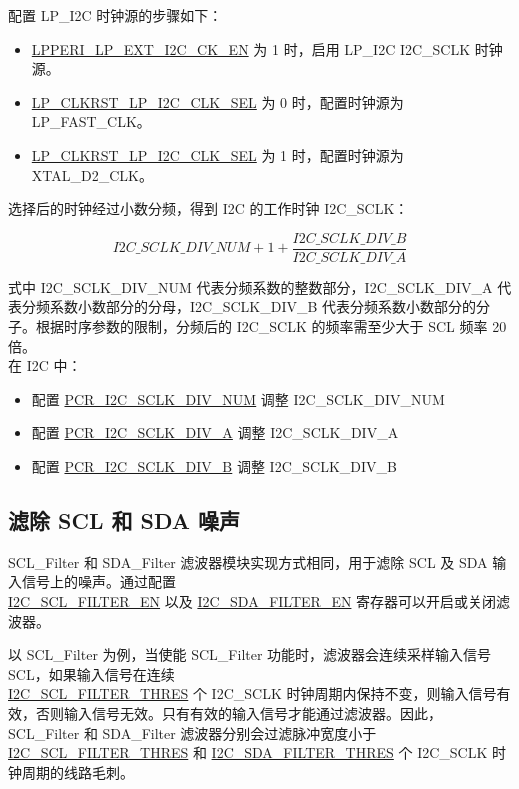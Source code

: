 \documentclass[main\_\_CN.tex]{subfiles}
\begin{document}
配置 LP\_I2C 时钟源的步骤如下：

\begin{itemize}
    \item \hyperref[fielddesc:LPPERILPEXTI2CCKEN]{LPPERI\_LP\_EXT\_I2C\_CK\_EN} 为 1 时，启用 LP\_I2C I2C\_SCLK 时钟源。
    \item \hyperref[fielddesc:LPCLKRSTLPI2CCLKSEL]{LP\_CLKRST\_LP\_I2C\_CLK\_SEL} 为 0 时，配置时钟源为 LP\_FAST\_CLK。
    \item \hyperref[fielddesc:LPCLKRSTLPI2CCLKSEL]{LP\_CLKRST\_LP\_I2C\_CLK\_SEL} 为 1 时，配置时钟源为 XTAL\_D2\_CLK。
\end{itemize}

选择后的时钟经过小数分频，得到 I2C 的工作时钟 I2C\_SCLK：

\begin{equation*}
I2C\_SCLK\_DIV\_NUM + 1+\frac{ I2C\_SCLK\_DIV\_B}{I2C\_SCLK\_DIV\_A}
\end{equation*}

式中 I2C\_SCLK\_DIV\_NUM 代表分频系数的整数部分，I2C\_SCLK\_DIV\_A 代表分频系数小数部分的分母，I2C\_SCLK\_DIV\_B 代表分频系数小数部分的分子。根据时序参数的限制，分频后的 I2C\_SCLK 的频率需至少大于 SCL 频率 20 倍。\\

在 I2C 中：

\begin{itemize}
    \item 配置 \hyperref[fielddesc:PCRI2CSCLKDIVNUM]{PCR\_I2C\_SCLK\_DIV\_NUM} 调整 I2C\_SCLK\_DIV\_NUM
    \item 配置 \hyperref[fielddesc:PCRI2CSCLKDIVA]{PCR\_I2C\_SCLK\_DIV\_A} 调整 I2C\_SCLK\_DIV\_A
    \item 配置 \hyperref[fielddesc:PCRI2CSCLKDIVB]{PCR\_I2C\_SCLK\_DIV\_B} 调整 I2C\_SCLK\_DIV\_B
\end{itemize}

\subsection{滤除 SCL 和 SDA 噪声}

SCL\_Filter 和 SDA\_Filter 滤波器模块实现方式相同，用于滤除 SCL 及 SDA 输入信号上的噪声。通过配置\\\hyperref[fielddesc:I2CSCLFILTEREN]{I2C\_SCL\_FILTER\_EN} 以及 \hyperref[fielddesc:I2CSDAFILTEREN]{I2C\_SDA\_FILTER\_EN} 寄存器可以开启或关闭滤波器。

以 SCL\_Filter 为例，当使能 SCL\_Filter 功能时，滤波器会连续采样输入信号 SCL，如果输入信号在连续 \\\hyperref[fielddesc:I2CSCLFILTERTHRES]{I2C\_SCL\_FILTER\_THRES} 个 I2C\_SCLK 时钟周期内保持不变，则输入信号有效，否则输入信号无效。只有有效的输入信号才能通过滤波器。因此，SCL\_Filter 和 SDA\_Filter 滤波器分别会过滤脉冲宽度小于 \hyperref[fielddesc:I2CSCLFILTERTHRES]{I2C\_SCL\_FILTER\_THRES} 和 \hyperref[fielddesc:I2CSDAFILTERTHRES]{I2C\_SDA\_FILTER\_THRES} 个 I2C\_SCLK 时钟周期的线路毛刺。
\end{document}

